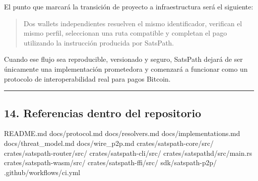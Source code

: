 \documentclass[
]{article}
\newenvironment{Shaded}{}{}
\newcommand{\NormalTok}[1]{#1}
\begin{document}
El punto que marcará la transición de proyecto a infraestructura será el
siguiente:

\begin{quote}
Dos wallets independientes resuelven el mismo identificador, verifican
el mismo perfil, seleccionan una ruta compatible y completan el pago
utilizando la instrucción producida por SatsPath.
\end{quote}

Cuando ese flujo sea reproducible, versionado y seguro, SatsPath dejará
de ser únicamente una implementación prometedora y comenzará a funcionar
como un protocolo de interoperabilidad real para pagos Bitcoin.

\begin{center}\rule{0.5\linewidth}{0.5pt}\end{center}

\hypertarget{referencias-dentro-del-repositorio}{%
\subsection{14. Referencias dentro del
repositorio}\label{referencias-dentro-del-repositorio}}

\begin{Shaded}
\begin{Highlighting}[]
\NormalTok{README.md}
\NormalTok{docs/protocol.md}
\NormalTok{docs/resolvers.md}
\NormalTok{docs/implementations.md}
\NormalTok{docs/threat\_model.md}
\NormalTok{docs/wire\_p2p.md}
\NormalTok{crates/satspath{-}core/src/}
\NormalTok{crates/satspath{-}router/src/}
\NormalTok{crates/satspath{-}cli/src/}
\NormalTok{crates/satspathd/src/main.rs}
\NormalTok{crates/satspath{-}wasm/src/}
\NormalTok{crates/satspath{-}ffi/src/}
\NormalTok{sdk/satspath{-}p2p/}
\NormalTok{.github/workflows/ci.yml}
\end{Highlighting}
\end{Shaded}
\end{document}
